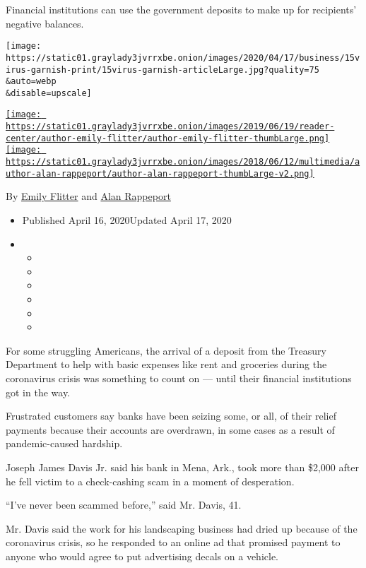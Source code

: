 Financial institutions can use the government deposits to make up for
recipients' negative balances.

\texttt{[image: https://static01.graylady3jvrrxbe.onion/images/2020/04/17/business/15virus-garnish-print/15virus-garnish-articleLarge.jpg?quality=75\\\&auto=webp\\\&disable=upscale]}

\href{https://www.nytimes3xbfgragh.onion/by/emily-flitter}{\texttt{[image: https://static01.graylady3jvrrxbe.onion/images/2019/06/19/reader-center/author-emily-flitter/author-emily-flitter-thumbLarge.png]}}\href{https://www.nytimes3xbfgragh.onion/by/alan-rappeport}{\texttt{[image: https://static01.graylady3jvrrxbe.onion/images/2018/06/12/multimedia/author-alan-rappeport/author-alan-rappeport-thumbLarge-v2.png]}}

By \href{https://www.nytimes3xbfgragh.onion/by/emily-flitter}{Emily
Flitter} and
\href{https://www.nytimes3xbfgragh.onion/by/alan-rappeport}{Alan
Rappeport}

\begin{itemize}
\item
  Published April 16, 2020Updated April 17, 2020
\item
  \begin{itemize}
  \item
  \item
  \item
  \item
  \item
  \item
  \end{itemize}
\end{itemize}

For some struggling Americans, the arrival of a deposit from the
Treasury Department to help with basic expenses like rent and groceries
during the coronavirus crisis was something to count on --- until their
financial institutions got in the way.

Frustrated customers say banks have been seizing some, or all, of their
relief payments because their accounts are overdrawn, in some cases as a
result of pandemic-caused hardship.

Joseph James Davis Jr. said his bank in Mena, Ark., took more than
\$2,000 after he fell victim to a check-cashing scam in a moment of
desperation.

``I've never been scammed before,'' said Mr. Davis, 41.

Mr. Davis said the work for his landscaping business had dried up
because of the coronavirus crisis, so he responded to an online ad that
promised payment to anyone who would agree to put advertising decals on
a vehicle.


